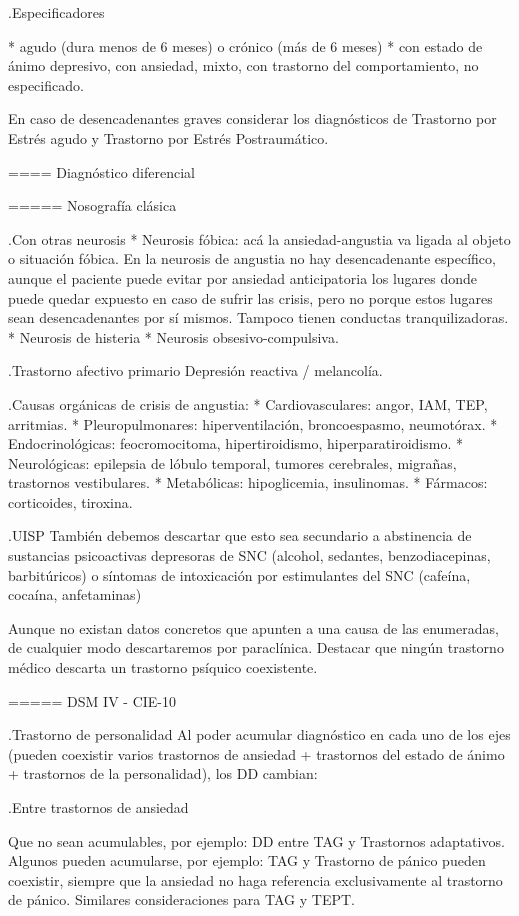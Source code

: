 \documentclass{scrbook}
\begin{document}
.Especificadores

* agudo (dura menos de 6 meses) o crónico (más de 6 meses)
* con estado de ánimo depresivo, con ansiedad, mixto, con trastorno del comportamiento, no especificado.

En caso de desencadenantes graves considerar los diagnósticos de Trastorno por Estrés agudo y Trastorno por Estrés Postraumático.

==== Diagnóstico diferencial

===== Nosografía clásica

.Con otras neurosis
* Neurosis fóbica: acá la ansiedad-angustia va ligada al objeto o situación fóbica. En la neurosis de angustia no hay desencadenante específico, aunque el paciente puede evitar por ansiedad anticipatoria los lugares donde puede quedar expuesto en caso de sufrir las crisis, pero no porque estos lugares sean desencadenantes por sí mismos. Tampoco tienen conductas tranquilizadoras.
* Neurosis de histeria
* Neurosis obsesivo-compulsiva.

.Trastorno afectivo primario
Depresión reactiva / melancolía.

.Causas orgánicas de crisis de angustia:
* Cardiovasculares: angor, IAM, TEP, arritmias.
* Pleuropulmonares: hiperventilación, broncoespasmo, neumotórax.
* Endocrinológicas: feocromocitoma, hipertiroidismo, hiperparatiroidismo.
* Neurológicas: epilepsia de lóbulo temporal, tumores cerebrales, migrañas, trastornos vestibulares.
* Metabólicas: hipoglicemia, insulinomas.
* Fármacos: corticoides, tiroxina.

.UISP
También debemos descartar que esto sea secundario a abstinencia de sustancias psicoactivas depresoras de SNC (alcohol, sedantes, benzodiacepinas, barbitúricos) o síntomas de intoxicación por estimulantes del SNC (cafeína, cocaína, anfetaminas)

Aunque no existan datos concretos que apunten a una causa de las enumeradas, de cualquier modo descartaremos por paraclínica. Destacar que ningún trastorno médico descarta un trastorno psíquico coexistente.

===== DSM IV - CIE-10

.Trastorno de personalidad
Al poder acumular diagnóstico en cada uno de los ejes (pueden coexistir varios trastornos de ansiedad + trastornos del estado de ánimo + trastornos de la personalidad), los DD cambian:

.Entre trastornos de ansiedad

Que no sean acumulables, por ejemplo: DD entre TAG y Trastornos adaptativos. Algunos pueden acumularse, por ejemplo: TAG y Trastorno de pánico pueden coexistir, siempre que la ansiedad no haga referencia exclusivamente al trastorno de pánico. Similares consideraciones para TAG y TEPT.
\end{document}
